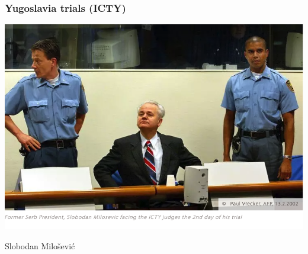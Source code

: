 \documentclass[aspectratio=43]{beamer}
\begin{document}



\begin{frame}
\frametitle{Yugoslavia trials (ICTY)}
\centering

\includegraphics[width = \textwidth]{img/milosevic}

Slobodan Milošević  

\end{frame}
  
\end{document}
